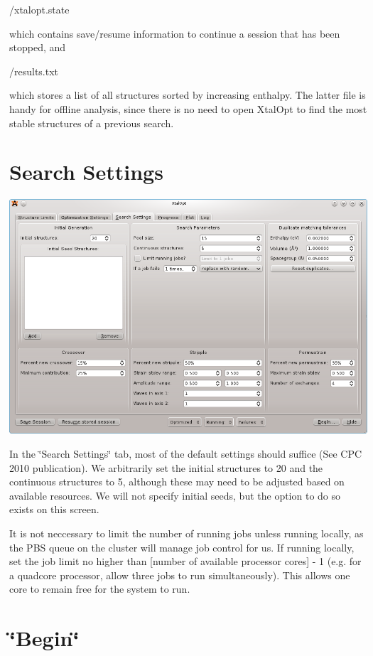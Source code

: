 \begin{DoxyCode}
/xtalopt.state
\end{DoxyCode}


which contains save/resume information to continue a session that has been stopped, and


\begin{DoxyCode}
/results.txt
\end{DoxyCode}


which stores a list of all structures sorted by increasing enthalpy. The latter file is handy for offline analysis, since there is no need to open Xtal\+Opt to find the most stable structures of a previous search.\hypertarget{tut-xo_search-set}{}\section{Search Settings}\label{tut-xo_search-set}
 
\begin{DoxyImageNoCaption}
  \mbox{\includegraphics[width=\textwidth]{search-set.png}}
\end{DoxyImageNoCaption}


In the \char`\"{}\+Search Settings\char`\"{} tab, most of the default settings should suffice (See C\+P\+C 2010 publication). We arbitrarily set the initial structures to 20 and the continuous structures to 5, although these may need to be adjusted based on available resources. We will not specify initial seeds, but the option to do so exists on this screen.

It is not neccessary to limit the number of running jobs unless running locally, as the P\+B\+S queue on the cluster will manage job control for us. If running locally, set the job limit no higher than \mbox{[}number of available processor cores\mbox{]} -\/ 1 (e.\+g. for a quadcore processor, allow three jobs to run simultaneously). This allows one core to remain free for the system to run.\hypertarget{tut-xo_begin}{}\section{\char`\"{}\+Begin\char`\"{}}\label{tut-xo_begin}

